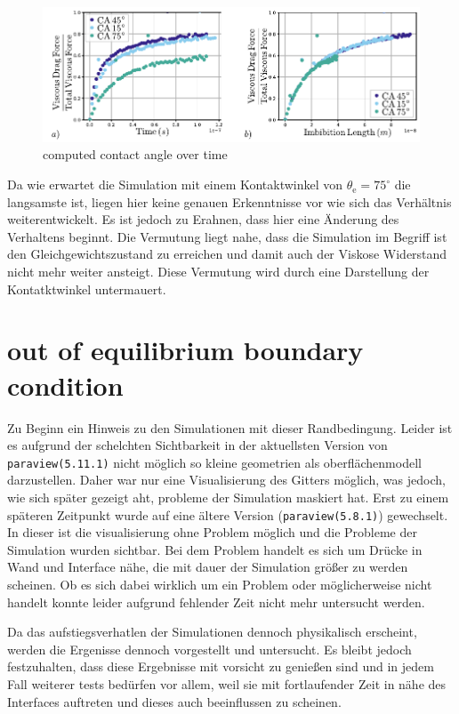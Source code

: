 \begin{figure}[h]
    \centering
    \includegraphics[width=.8\textwidth]{Pictures/CA_Forces_Variation.pdf}
    \caption{computed contact angle over time }
    \label{fig: CA_Forces} 
\end{figure}
Da wie erwartet die Simulation mit einem Kontaktwinkel von $\theta_{\mathrm{e}}=75^{\circ}$ die langsamste ist, liegen hier keine genauen Erkenntnisse vor wie sich das Verhältnis weiterentwickelt. Es ist jedoch zu Erahnen, dass hier eine Änderung des Verhaltens beginnt. Die Vermutung liegt nahe, dass die Simulation im Begriff ist den Gleichgewichtszustand zu erreichen und damit auch der Viskose Widerstand nicht mehr weiter ansteigt. Diese Vermutung wird durch eine Darstellung der Kontatktwinkel untermauert. 




\section{out of equilibrium boundary condition}
\label{sec: outOfEquilibriumBoundaryCondition}
Zu Beginn ein Hinweis zu den Simulationen mit dieser Randbedingung. Leider ist es aufgrund der schelchten Sichtbarkeit in der aktuellsten Version von \texttt{paraview(5.11.1)} nicht möglich so kleine geometrien als oberflächenmodell darzustellen. Daher war nur eine Visualisierung des Gitters möglich, was jedoch, wie sich später gezeigt aht, probleme der Simulation maskiert hat. Erst zu einem späteren Zeitpunkt wurde auf eine ältere Version (\texttt{paraview(5.8.1)}) gewechselt. In dieser ist die visualisierung ohne Problem möglich und die Probleme der Simulation wurden sichtbar. Bei dem Problem handelt es sich um Drücke in Wand und Interface nähe, die mit dauer der Simulation größer zu werden scheinen. Ob es sich dabei wirklich um ein Problem oder möglicherweise nicht handelt konnte leider aufgrund fehlender Zeit nicht mehr untersucht werden. 

Da das aufstiegsverhatlen der Simulationen dennoch physikalisch erscheint, werden die Ergenisse dennoch vorgestellt und untersucht. Es bleibt jedoch festzuhalten, dass diese Ergebnisse mit vorsicht zu genießen sind und in jedem Fall weiterer tests bedürfen vor allem, weil sie mit fortlaufender Zeit in nähe des Interfaces auftreten und dieses auch beeinflussen zu scheinen. 

